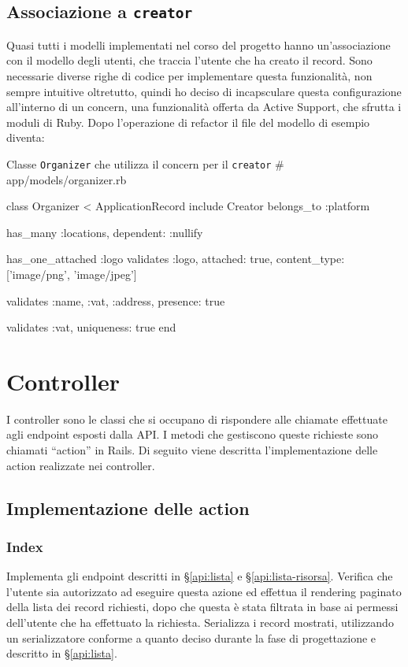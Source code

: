 \subsection{Associazione a \texttt{creator}}
Quasi tutti i modelli implementati nel corso del progetto hanno un'associazione con il modello degli utenti, che traccia l'utente che ha creato il record. Sono necessarie diverse righe di codice per implementare questa funzionalità, non sempre intuitive oltretutto, quindi ho deciso di incapsculare questa configurazione all'interno di un concern, una funzionalità offerta da Active Support, che sfrutta i moduli di Ruby. Dopo l'operazione di refactor il file del modello di esempio diventa:
\begin{code}{Classe \texttt{Organizer} che utilizza il concern per il \texttt{creator}}
# app/models/organizer.rb

class Organizer < ApplicationRecord
	include Creator
	belongs_to :platform

	has_many :locations, dependent: :nullify

	has_one_attached :logo
	validates :logo, attached: true, content_type: ['image/png', 'image/jpeg']

	validates :name,
			:vat,
			:address,
			presence: true

	validates :vat, uniqueness: true
end
\end{code}

\section{Controller}
I controller sono le classi che si occupano di rispondere alle chiamate effettuate agli endpoint esposti dalla API. I metodi che gestiscono queste richieste sono chiamati ``action'' in Rails. Di seguito viene descritta l'implementazione delle action realizzate nei controller.

\subsection{Implementazione delle action}
\subsubsection{Index}
Implementa gli endpoint descritti in \S \ref{api:lista} e \S \ref{api:lista-risorsa}. Verifica che l'utente sia autorizzato ad eseguire questa azione ed effettua il rendering paginato della lista dei record richiesti, dopo che questa è stata filtrata in base ai permessi dell'utente che ha effettuato la richiesta. Serializza i record mostrati, utilizzando un serializzatore conforme a quanto deciso durante la fase di progettazione e descritto in \S \ref{api:lista}.

